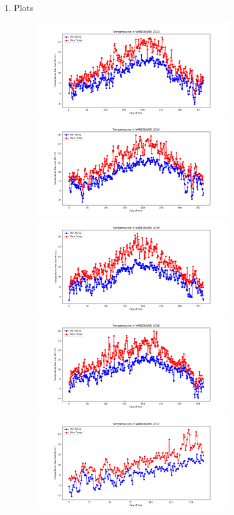 \documentclass{article}
\begin{document}
\begin{enumerate}

\item  Plots 

\begin{center}
\begin{figure}[!h]
\includegraphics[width=3.25in]{../Plot/VANCOUVER/day_vs_temp_2013.png}

\includegraphics[width=3.25in]{../Plot/VANCOUVER/day_vs_temp_2014.png}

\includegraphics[width=3.25in]{../Plot/VANCOUVER/day_vs_temp_2015.png}

\includegraphics[width=3.25in]{../Plot/VANCOUVER/day_vs_temp_2016.png}

\includegraphics[width=3.25in]{../Plot/VANCOUVER/day_vs_temp_2017.png}



\end{figure}
\end{center}
\end{enumerate}
\end{document}
